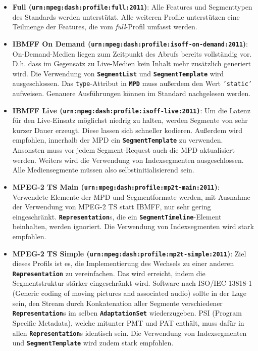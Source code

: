 \documentclass[paper = a4, fontsize = 12pt, parskip = half]{scrartcl} %
\def\attr#1{\texttt{#1}}
\def\elem#1{\texttt{\textbf{#1}}}
\begin{document}
\begin{itemize}
	\item \textbf{Full (\attr{urn:mpeg:dash:profile:full:2011})}: Alle Features und Segmenttypen des Standards werden unterstützt. Alle weiteren Profile unterstützen eine Teilmenge der Features, die vom \textit{full}-Profil umfasst werden.
	\item \textbf{IBMFF On Demand (\attr{urn:mpeg:dash:profile:isoff-on-demand:2011})}: On-Demand-Medien liegen zum Zeitpunkt des Abrufs bereits vollständig vor. D.h. dass im Gegensatz zu Live-Medien kein Inhalt mehr zusätzlich generiert wird. Die Verwendung von \elem{SegmentList} und \elem{SegmentTemplate} wird  ausgeschlossen. Das \attr{type}-Attribut in \elem{MPD} muss außerdem den Wert \attr{'static'} aufweisen. Genauere Ausführungen können im Standard nachgelesen werden.
	\item \textbf{IBMFF Live (\attr{urn:mpeg:dash:profile:isoff-live:2011)}}: Um die Latenz für den Live-Einsatz möglichst niedrig zu halten, werden Segmente von sehr kurzer Dauer erzeugt. Diese lassen sich schneller kodieren. Außerdem wird empfohlen, innerhalb der MPD ein \elem{SegmentTemplate} zu verwenden. Ansonsten muss vor jedem Segment-Request auch die MPD aktualisiert werden. Weiters wird die Verwendung von Indexsegmenten ausgeschlossen. Alle Mediensegmente müssen also selbstinitialisierend sein.
	\item \textbf{MPEG-2 TS Main (\attr{urn:mpeg:dash:profile:mp2t-main:2011})}: Verwendete Elemente der MPD und Segmentformate werden, mit Ausnahme der Verwendung von MPEG-2 TS statt IBMFF, nur sehr gering eingeschränkt. \elem{Representation}s, die ein \elem{SegmentTimeline}-Element beinhalten, werden ignoriert. Die Verwendung von Indexsegmenten wird stark empfohlen.
	\item \textbf{MPEG-2 TS Simple (\attr{urn:mpeg:dash:profile:mp2t-simple:2011})}: Ziel dieses Profils ist es, die Implementierung des Wechsels zu einer anderen \elem{Representation} zu vereinfachen. Das wird erreicht, indem die Segmentstruktur stärker eingeschränkt wird. Software nach ISO/IEC 13818-1 (Generic coding of moving pictures and associated audio) \cite{mpeg2_p1} sollte in der Lage sein, den Stream durch Konkatenation aller Segmente verschiedener \elem{Representation}s im selben \elem{AdaptationSet} wiederzugeben. PSI (Program Specific Metadata), welche mitunter PMT und PAT enthält, muss dafür in allen \elem{Representation}s identisch sein. Die Verwendung von Indexsegmenten und \elem{SegmentTemplate} wird zudem stark empfohlen.
\end{itemize}
 
\end{document}

